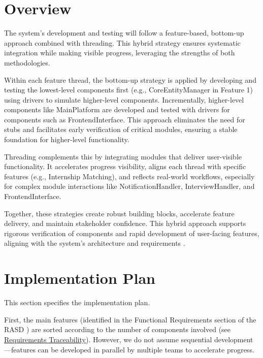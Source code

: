 \section{Overview}

The system's development and testing will follow a feature-based, bottom-up approach combined with threading. This hybrid strategy ensures systematic integration while making visible progress, leveraging the strengths of both methodologies.

Within each feature thread, the bottom-up strategy is applied by developing and testing the lowest-level components first (e.g., CoreEntityManager in Feature 1) using drivers to simulate higher-level components. Incrementally, higher-level components like MainPlatform are developed and tested with drivers for components such as FrontendInterface. This approach eliminates the need for stubs and facilitates early verification of critical modules, ensuring a stable foundation for higher-level functionality.

Threading complements this by integrating modules that deliver user-visible functionality. It accelerates progress visibility, aligns each thread with specific features (e.g., Internship Matching), and reflects real-world workflows, especially for complex module interactions like NotificationHandler, InterviewHandler, and FrontendInterface.

Together, these strategies create robust building blocks, accelerate feature delivery, and maintain stakeholder confidence. This hybrid approach supports rigorous verification of components and rapid development of user-facing features, aligning with the system’s architecture and requirements \cite{Camilli2024}.

\section{Implementation Plan}

This section specifies the implementation plan.

First, the main features (identified in the Functional Requirements section of the RASD \cite{ContiMarino2024}) are sorted according to the number of components involved (see \hyperref[ch:requirements_traceability]{Requirements Traceability}). However, we do not assume sequential development—features can be developed in parallel by multiple teams to accelerate progress.

